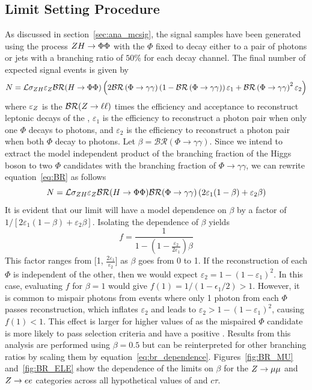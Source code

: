 \subsection{Limit Setting Procedure} \label{sec:ana_limits}
As discussed in section~\ref{sec:ana_mcsig}, the signal samples have been generated using the process $ZH\to\Phi\Phi$ with the $\Phi$ fixed to decay either to a pair of photons or jets with a branching ratio of $50\%$ for each decay channel. The final number of expected signal events is given by
\begin{equation}
	\label{eq:BR}
	N=\mathcal{L}\sigma_{ZH}\varepsilon_Z\mathcal{BR}(H\to\Phi\Phi)\left ( 2\mathcal{BR} \left ( \Phi \rightarrow \gamma \gamma \right ) \left(1-\mathcal{BR} \left ( \Phi \rightarrow \gamma \gamma \right ) \right ) \varepsilon_{1} +\mathcal{BR} \left ( \Phi \rightarrow \gamma \gamma \right )^2 \varepsilon_{2}  \right )
\end{equation}
where $\varepsilon_Z$ is the $\mathcal{BR}(Z\to\ell\ell)$ times the efficiency and acceptance to reconstruct leptonic decays of the \VZ, $\varepsilon_{1}$ is the efficiency to reconstruct a photon pair when only one $\Phi$ decays to photons, and $\varepsilon_{2}$ is the efficiency to reconstruct a photon pair when both $\Phi$ decay to photons. Let $\beta=\mathcal{BR}(\Phi\to\gamma\gamma)$. Since we intend to extract the model independent product of the branching fraction of the Higgs boson to two $\Phi$ candidates with the branching fraction of $\Phi\to\gamma\gamma$, we can rewrite equation~\ref{eq:BR} as follows
\begin{equation}
	N=\mathcal{L}\sigma_{ZH}\varepsilon_Z\mathcal{BR}(H\to\Phi\Phi)\mathcal{BR}(\Phi\to\gamma\gamma)\left (2\varepsilon_{1}(1-\beta)+\varepsilon_{2}\beta  \right )
	\label{eq:BR_beta}
\end{equation}
It is evident that our limit will have a model dependence on $\beta$ by a factor of $1/\left[2\varepsilon_{1}(1-\beta)+\varepsilon_{2}\beta\right]$. Isolating the dependence of $\beta$ yields
\begin{equation}
	f=\frac{1}{1-(1-\frac{\varepsilon_{2}}{2\varepsilon_{1}})\beta}
	\label{eq:br_dependence}
\end{equation}
This factor ranges from [1, $\frac{2\varepsilon_{1}}{\varepsilon_{2}}$] as $\beta$ goes from 0 to 1. If the reconstruction of each $\Phi$ is independent of the other, then we would expect $\varepsilon_2=1-(1-\varepsilon_1)^2$. In this case, evaluating $f$ for $\beta=1$ would give $f(1)=1/(1-\epsilon_1/2)>1$. However, it is common to mispair photons from events where only 1 photon from each $\Phi$ passes reconstruction, which inflates $\varepsilon_2$ and leads to $\varepsilon_2>1-(1-\varepsilon_1)^2$, causing $f(1)<1$. This effect is larger for higher values of \mphi as the mispaired $\Phi$ candidate is more likely to pass selection criteria and have a positive \lxy. Results from this analysis are performed using $\beta=0.5$ but can be reinterpreted for other branching ratios by scaling them by equation~\ref{eq:br_dependence}. Figures~\ref{fig:BR_MU} and~\ref{fig:BR_ELE} show the dependence of the limits on $\beta$ for the $Z\to\mu\mu$ and $Z\to ee$ categories across all hypothetical values of \mphi and $c\tau$.

